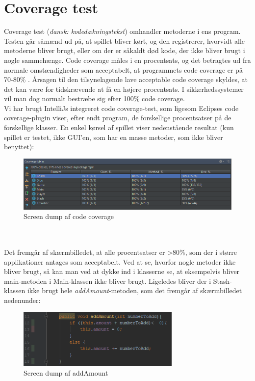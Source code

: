 \section{Coverage test}
Coverage test (\textit{dansk: kodedækningstekst}) omhandler metoderne i ens program.
Testen går såmænd ud på, at spillet bliver kørt, og den registrerer, hvorvidt alle metoderne bliver brugt, eller om der er såkaldt død kode, der ikke bliver brugt i nogle sammehænge.
Code coverage måles i en procentsats, og det betragtes ud fra normale omstændigheder som acceptabelt, at programmets code coverage er på 70-80\% \autocite{website:steve_cornett}.
Årsagen til den tilsynelagende lave acceptable code coverage skyldes, at det kan være for tidskrævende at få en højere procentsats.
I sikkerhedssystemer vil man dog normalt bestræbe sig efter 100\% code coverage.
\\
Vi har brugt IntelliJs integreret code coverage-test, som ligesom Eclipses code coverage-plugin viser, efter endt program, de forskellige procentsatser på de forskellige klasser. En enkel kørsel af spillet viser nedenstående resultat (kun spillet er testet, ikke GUI'en, som har en masse metoder, som ikke bliver benyttet):
\begin{figure}
    \begin{center}
        \includegraphics[width=15cm]{graphics/coveragetest/coveragetest1.png}
        \caption{Screen dump af code coverage}
        \label{fig:codecoverage}
    \end{center}
\end{figure}
\\ \\
Det fremgår af skærmbilledet, at alle procentsatser er >80\%, som der i større applikationer antages som acceptabelt. Ved at se, hvorfor nogle metoder ikke bliver brugt, så kan man ved at dykke ind i klasserne se, at eksempelvis bliver main-metoden i Main-klassen ikke bliver brugt. Ligeledes bliver der i Stash-klassen ikke brugt hele \textit{addAmount}-metoden, som det fremgår af skærmbilledet nedenunder:
\begin{figure}
    \begin{center}
        \includegraphics[width=8cm]{graphics/coveragetest/coveragetest2.png}
        \caption{Screen dump af addAmount}
        \label{fig:codecoverage_addamount}
    \end{center}
\end{figure}

